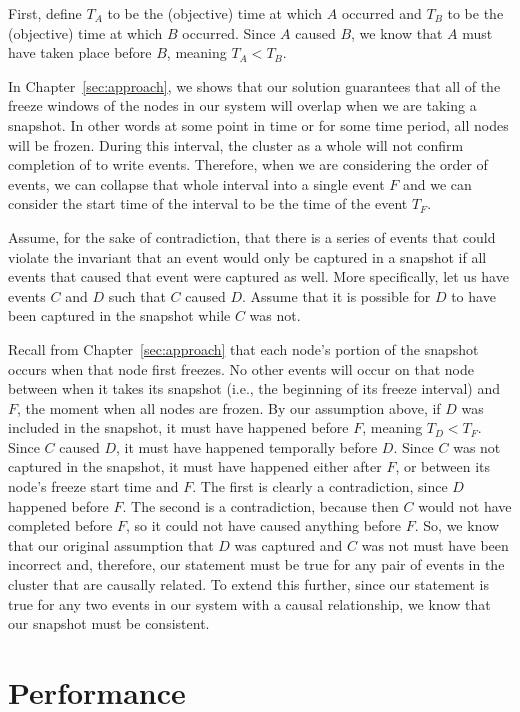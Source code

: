 First, define $T_A$ to be the (objective) time at which $A$ occurred
and $T_B$ to be the (objective) time at which $B$ occurred. Since $A$
caused $B$, we know that $A$ must have taken place before $B$, meaning
$T_A < T_B$.

In Chapter~\ref{sec:approach}, we shows that our solution guarantees
that all of the freeze windows of the nodes in our system will overlap
when we are taking a snapshot. In other words at some point in time or
for some time period, all nodes will be frozen.  During this interval,
the cluster as a whole will not confirm completion of to write
events. Therefore, when we are considering the order of events, we can
collapse that whole interval into a single event $F$ and we can
consider the start time of the interval to be the time of the event
$T_F$.

Assume, for the sake of contradiction, that there is a series of
events that could violate the invariant that an event would only be
captured in a snapshot if all events that caused that event were
captured as well. More specifically, let us have events $C$ and $D$
such that $C$ caused $D$. Assume that it is possible for $D$ to have
been captured in the snapshot while $C$ was not.

Recall from Chapter~\ref{sec:approach} that each node's portion of the
snapshot occurs when that node first freezes. No other events will
occur on that node between when it takes its snapshot (i.e., the
beginning of its freeze interval) and $F$, the moment when all nodes
are frozen. By our assumption above, if $D$ was included in the
snapshot, it must have happened before $F$, meaning $T_D <T_F$. Since
$C$ caused $D$, it must have happened temporally before $D$.  Since
$C$ was not captured in the snapshot, it must have happened either
after $F$, or between its node's freeze start time and $F$. The first
is clearly a contradiction, since $D$ happened before $F$. The second
is a contradiction, because then $C$ would not have completed before
$F$, so it could not have caused anything before $F$. So, we know that
our original assumption that $D$ was captured and $C$ was not must
have been incorrect and, therefore, our statement must be true for any
pair of events in the cluster that are causally related. To extend
this further, since our statement is true for any two events in our
system with a causal relationship, we know that our snapshot must be
consistent.

\section{Performance}

